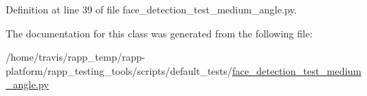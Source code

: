 Definition at line 39 of file face\-\_\-detection\-\_\-test\-\_\-medium\-\_\-angle.\-py.



The documentation for this class was generated from the following file\-:\begin{DoxyCompactItemize}
\item 
/home/travis/rapp\-\_\-temp/rapp-\/platform/rapp\-\_\-testing\-\_\-tools/scripts/default\-\_\-tests/\hyperlink{face__detection__test__medium__angle_8py}{face\-\_\-detection\-\_\-test\-\_\-medium\-\_\-angle.\-py}\end{DoxyCompactItemize}
